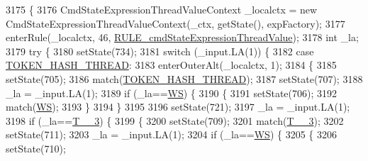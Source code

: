 \begin{DoxyCode}
3175                                                                                                            
                                       \{
3176     CmdStateExpressionThreadValueContext \_localctx = \textcolor{keyword}{new} CmdStateExpressionThreadValueContext(\_ctx, 
      getState(), expFactory);
3177     enterRule(\_localctx, 46, \hyperlink{classgov_1_1nasa_1_1jpf_1_1inspector_1_1server_1_1expression_1_1parser_1_1_expression_grammar_parser_ad476f9809eb94bb05fde40ac0a4e5170}{RULE\_cmdStateExpressionThreadValue});
3178     \textcolor{keywordtype}{int} \_la;
3179     \textcolor{keywordflow}{try} \{
3180       setState(734);
3181       \textcolor{keywordflow}{switch} (\_input.LA(1)) \{
3182       \textcolor{keywordflow}{case} \hyperlink{classgov_1_1nasa_1_1jpf_1_1inspector_1_1server_1_1expression_1_1parser_1_1_expression_grammar_parser_a376220dbe16a9b729f2bae908c6e40d2}{TOKEN\_HASH\_THREAD}:
3183         enterOuterAlt(\_localctx, 1);
3184         \{
3185         setState(705);
3186         match(\hyperlink{classgov_1_1nasa_1_1jpf_1_1inspector_1_1server_1_1expression_1_1parser_1_1_expression_grammar_parser_a376220dbe16a9b729f2bae908c6e40d2}{TOKEN\_HASH\_THREAD});
3187         setState(707);
3188         \_la = \_input.LA(1);
3189         \textcolor{keywordflow}{if} (\_la==\hyperlink{classgov_1_1nasa_1_1jpf_1_1inspector_1_1server_1_1expression_1_1parser_1_1_expression_grammar_parser_ace44714ae633c7b14794cc5a24d9ebf3}{WS}) \{
3190           \{
3191           setState(706);
3192           match(\hyperlink{classgov_1_1nasa_1_1jpf_1_1inspector_1_1server_1_1expression_1_1parser_1_1_expression_grammar_parser_ace44714ae633c7b14794cc5a24d9ebf3}{WS});
3193           \}
3194         \}
3195 
3196         setState(721);
3197         \_la = \_input.LA(1);
3198         \textcolor{keywordflow}{if} (\_la==\hyperlink{classgov_1_1nasa_1_1jpf_1_1inspector_1_1server_1_1expression_1_1parser_1_1_expression_grammar_parser_a68f9589dcc3fc777455467ff010385ea}{T\_\_3}) \{
3199           \{
3200           setState(709);
3201           match(\hyperlink{classgov_1_1nasa_1_1jpf_1_1inspector_1_1server_1_1expression_1_1parser_1_1_expression_grammar_parser_a68f9589dcc3fc777455467ff010385ea}{T\_\_3});
3202           setState(711);
3203           \_la = \_input.LA(1);
3204           \textcolor{keywordflow}{if} (\_la==\hyperlink{classgov_1_1nasa_1_1jpf_1_1inspector_1_1server_1_1expression_1_1parser_1_1_expression_grammar_parser_ace44714ae633c7b14794cc5a24d9ebf3}{WS}) \{
3205             \{
3206             setState(710);

\end{DoxyCode}
